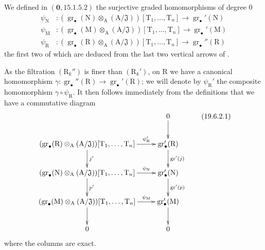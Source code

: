 \begin{env}[19.6.2]
\label{IV.19.6.2}
We defined in $(\mathbf{0},15.1.5.2)$ the surjective graded homomorphisms of degree $0$
\begin{align*}
  \psi_\mathrm{N} &: (\operatorname{gr}_\bullet(\mathrm{N})\otimes_\mathrm{A}(\mathrm{A}/\mathfrak{J}))[\mathrm{T}_1,\ldots,\mathrm{T}_n] \to \operatorname{gr}_\bullet'(\mathrm{N}) \\
  \psi_\mathrm{M} &: (\operatorname{gr}_\bullet(\mathrm{M})\otimes_\mathrm{A}(\mathrm{A}/\mathfrak{J}))[\mathrm{T}_1,\ldots,\mathrm{T}_n] \to \operatorname{gr}_\bullet'(\mathrm{M}) \\
  \psi_\mathrm{R} &: (\operatorname{gr}_\bullet(\mathrm{R})\otimes_\mathrm{A}(\mathrm{A}/\mathfrak{J}))[\mathrm{T}_1,\ldots,\mathrm{T}_n] \to \operatorname{gr}_\bullet''(\mathrm{R})
\end{align*}
the first two of which are deduced from the last two vertical arrows of .

As the filtration $(\mathrm{R}_k'')$ is finer than $(\mathrm{R}_k')$, on $\mathrm{R}$ we have a canonical homomorphism $\gamma:\operatorname{gr}_\bullet''(\mathrm{R})\to\operatorname{gr}_\bullet'(\mathrm{R})$; we will denote by $\psi_\mathrm{R}'$ the composite homomorphism $\gamma\circ\psi_\mathrm{R}$. It then follows immediately from the definitions that we have a commutative diagram
\[
\xymatrix{
  & 0 \ar[d] \\
  (\operatorname{gr}_\bullet(\mathrm{R})\otimes_\mathrm{A}(\mathrm{A}/\mathfrak{J}))[\mathrm{T}_1,\ldots,\mathrm{T}_n] \ar[r]^-{\psi_\mathrm{R}'} \ar[d]^{j'} & \operatorname{gr}_\bullet'(\mathrm{R}) \ar[d]^{\operatorname{gr}'(j)} \\
  (\operatorname{gr}_\bullet(\mathrm{N})\otimes_\mathrm{A}(\mathrm{A}/\mathfrak{J}))[\mathrm{T}_1,\ldots,\mathrm{T}_n] \ar[r]^-{\psi_\mathrm{N}} \ar[d]^{p'} & \operatorname{gr}_\bullet'(\mathrm{N}) \ar[d]^{\operatorname{gr}'(p)} \\
  (\operatorname{gr}_\bullet(\mathrm{M})\otimes_\mathrm{A}(\mathrm{A}/\mathfrak{J}))[\mathrm{T}_1,\ldots,\mathrm{T}_n] \ar[r]^-{\psi_\mathrm{M}} \ar[d] & \operatorname{gr}_\bullet'(\mathrm{M}) \ar[d] \\
  0 & 0
}
\tag{19.6.2.1}
\]
where the columns are exact.
\end{env}

